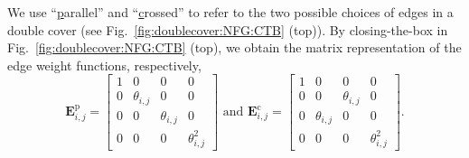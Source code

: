 \documentclass[conference]{IEEEtran}
\theoremstyle{plain}
\theoremstyle{definition}
\begin{document}
 We use ``\underline{p}arallel'' and ``\underline{c}rossed'' to refer to the
 two possible choices of edges in a double cover (see
 Fig.~\ref{fig:doublecover:NFG:CTB} (top)). By closing-the-box in
 Fig.~\ref{fig:doublecover:NFG:CTB} (top), we obtain the matrix representation
 of the edge weight functions, respectively,
 \[
  \mathbf E_{i,j}^{\mathrm{p}}=\begin{bmatrix}
   1 & 0            & 0            & 0               \\
   0 & \theta_{i,j} & 0            & 0               \\
   0 & 0            & \theta_{i,j} & 0               \\
   0 & 0            & 0            & \theta_{i,j} ^2
  \end{bmatrix} \text{ and }
  \mathbf E_{i,j}^{\mathrm{c}}=\begin{bmatrix}
   1 & 0            & 0            & 0               \\
   0 & 0            & \theta_{i,j} & 0               \\
   0 & \theta_{i,j} & 0            & 0               \\
   0 & 0            & 0            & \theta_{i,j} ^2
  \end{bmatrix}.
 \]
\end{document}
